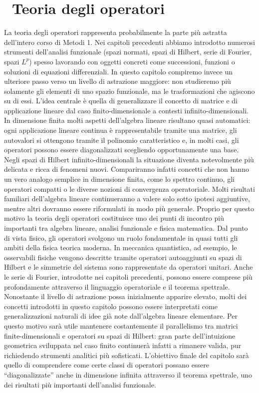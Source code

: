 \documentclass[a4paper,12pt]{report}
\begin{document}
\newpage

\chapter{\ Teoria degli operatori}
\vspace{2cm}
La teoria degli operatori rappresenta probabilmente la parte più astratta dell’intero corso di Metodi 1. Nei capitoli precedenti abbiamo introdotto numerosi strumenti dell’analisi funzionale (spazi normati, spazi di Hilbert, serie di Fourier, spazi $L^p$) spesso lavorando con oggetti concreti come successioni, funzioni o soluzioni di equazioni differenziali. In questo capitolo compiremo invece un ulteriore passo verso un livello di astrazione maggiore: non studieremo più solamente gli elementi di uno spazio funzionale, ma le trasformazioni che agiscono su di essi.
L’idea centrale è quella di generalizzare il concetto di matrice e di applicazione lineare dal caso finito-dimensionale a contesti infinito-dimensionali. In dimensione finita molti aspetti dell’algebra lineare risultano quasi automatici: ogni applicazione lineare continua è rappresentabile tramite una matrice, gli autovalori si ottengono tramite il polinomio caratteristico e, in molti casi, gli operatori possono essere diagonalizzati scegliendo opportunamente una base. Negli spazi di Hilbert infinito-dimensionali la situazione diventa notevolmente più delicata e ricca di fenomeni nuovi.
Compariranno infatti concetti che non hanno un vero analogo semplice in dimensione finita, come lo spettro continuo, gli operatori compatti o le diverse nozioni di convergenza operatoriale. Molti risultati familiari dell’algebra lineare continueranno a valere solo sotto ipotesi aggiuntive, mentre altri dovranno essere riformulati in modo più generale. Proprio per questo motivo la teoria degli operatori costituisce uno dei punti di incontro più importanti tra algebra lineare, analisi funzionale e fisica matematica.
Dal punto di vista fisico, gli operatori svolgono un ruolo fondamentale in quasi tutti gli ambiti della fisica teorica moderna. In meccanica quantistica, ad esempio, le osservabili fisiche vengono descritte tramite operatori autoaggiunti su spazi di Hilbert e le simmetrie del sistema sono rappresentate da operatori unitari. Anche le serie di Fourier, introdotte nei capitoli precedenti, possono essere comprese più profondamente attraverso il linguaggio operatoriale e il teorema spettrale.
Nonostante il livello di astrazione possa inizialmente apparire elevato, molti dei concetti introdotti in questo capitolo possono essere interpretati come generalizzazioni naturali di idee già note dall’algebra lineare elementare. Per questo motivo sarà utile mantenere costantemente il parallelismo tra matrici finite-dimensionali e operatori su spazi di Hilbert: gran parte dell’intuizione geometrica sviluppata nel caso finito continuerà infatti a rimanere valida, pur richiedendo strumenti analitici più sofisticati.
L’obiettivo finale del capitolo sarà quello di comprendere come certe classi di operatori possano essere “diagonalizzate” anche in dimensione infinita attraverso il teorema spettrale, uno dei risultati più importanti dell’analisi funzionale.
\end{document}
